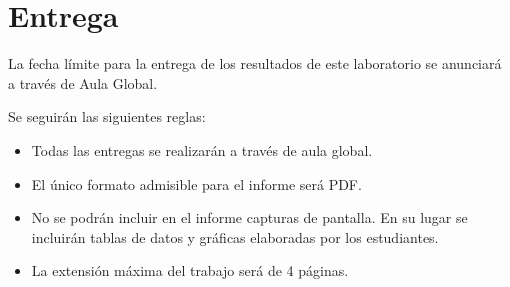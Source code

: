 \clearpage
\section{Entrega}

La fecha límite para la entrega de los resultados de este laboratorio 
se anunciará a través de Aula Global.

Se seguirán las siguientes reglas:

\begin{itemize}

  \item Todas las entregas se realizarán a través de aula global.

  \item El único formato admisible para el informe será PDF.

  \item No se podrán incluir en el informe capturas de pantalla.
        En su lugar se incluirán tablas de datos y gráficas elaboradas por los estudiantes.

  \item La extensión máxima del trabajo será de 4 páginas.

\end{itemize}

